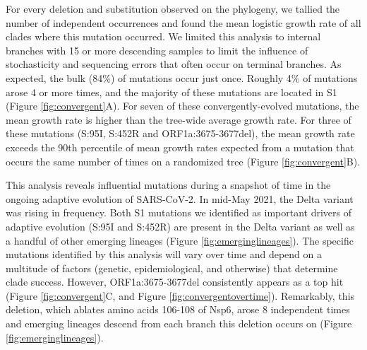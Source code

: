 \documentclass[11pt,oneside,letterpaper]{article}
\begin{document}
For every deletion and substitution observed on the phylogeny, we tallied the number of independent occurrences and found the mean logistic growth rate of all clades where this mutation occurred.
We limited this analysis to internal branches with 15 or more descending samples to limit the influence of stochasticity and sequencing errors that often occur on terminal branches.
As expected, the bulk (84\%) of mutations occur just once.
Roughly 4\% of mutations arose 4 or more times, and the majority of these mutations are located in S1 (Figure \ref{fig:convergent}A).
For seven of these convergently-evolved mutations, the mean growth rate is higher than the tree-wide average growth rate.
For three of these mutations (S:95I, S:452R and ORF1a:3675-3677del), the mean growth rate exceeds the 90th percentile of mean growth rates expected from a mutation that occurs the same number of times on a randomized tree (Figure \ref{fig:convergent}B).

This analysis reveals influential mutations during a snapshot of time in the ongoing adaptive evolution of SARS-CoV-2.
In mid-May 2021, the Delta variant was rising in frequency.
Both S1 mutations we identified as important drivers of adaptive evolution (S:95I and S:452R) are present in the Delta variant as well as a handful of other emerging lineages (Figure \ref{fig:emerginglineages}).
The specific mutations identified by this analysis will vary over time and depend on a multitude of factors (genetic, epidemiological, and otherwise) that determine clade success.
However, ORF1a:3675-3677del consistently appears as a top hit (Figure \ref{fig:convergent}C, and Figure \ref{fig:convergentovertime}).
Remarkably, this deletion, which ablates amino acids 106-108 of Nsp6, arose 8 independent times and emerging lineages descend from each branch this deletion occurs on (Figure \ref{fig:emerginglineages}).
\end{document}
